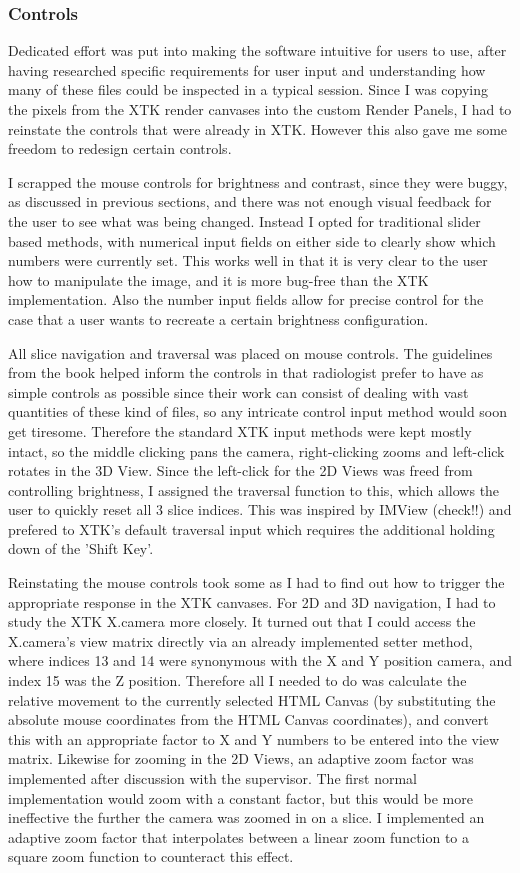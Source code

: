 \documentclass[a4paper,11pt,twoside]{article}
\begin{document}
\subsubsection{Controls}

Dedicated effort was put into making the software intuitive for users to use, after having researched specific requirements for user input and understanding how many of these files could be inspected in a typical session. Since I was copying the pixels from the XTK render canvases into the custom Render Panels, I had to reinstate the controls that were already in XTK. However this also gave me some freedom to redesign certain controls.

I scrapped the mouse controls for brightness and contrast, since they were buggy, as discussed in previous sections, and there was not enough visual feedback for the user to see what was being changed. Instead I opted for traditional slider based methods, with numerical input fields on either side to clearly show which numbers were currently set. This works well in that it is very clear to the user how to manipulate the image, and it is more bug-free than the XTK implementation. Also the number input fields allow for precise control for the case that a user wants to recreate a certain brightness configuration.

All slice navigation and traversal was placed on mouse controls. The guidelines from the book helped inform the controls in that radiologist prefer to have as simple controls as possible since their work can consist of dealing with vast quantities of these kind of files, so any intricate control input method would soon get tiresome. Therefore the standard XTK input methods were kept mostly intact, so the middle clicking pans the camera, right-clicking zooms and left-click rotates in the 3D View. Since the left-click for the 2D Views was freed from controlling brightness, I assigned the traversal function to this, which allows the user to quickly reset all 3 slice indices. This was inspired by IMView (check!!) and prefered to XTK's default traversal input which requires the additional holding down of the 'Shift Key'.

Reinstating the mouse controls took some as I had to find out how to trigger the appropriate response in the XTK canvases. For 2D and 3D navigation, I had to study the XTK X.camera more closely. It turned out that I could access the X.camera's view matrix directly via an already implemented setter method, where indices 13 and 14 were synonymous with the X and Y position camera, and index 15 was the Z position. Therefore all I needed to do was calculate the relative movement to the currently selected HTML Canvas (by substituting the absolute mouse coordinates from the HTML Canvas coordinates), and convert this with an appropriate factor to X and Y numbers to be entered into the view matrix.
Likewise for zooming in the 2D Views, an adaptive zoom factor was implemented after discussion with the supervisor. The first normal implementation would zoom with a constant factor, but this would be more ineffective the further the camera was zoomed in on a slice. I implemented an adaptive zoom factor that interpolates between a linear zoom function to a square zoom function to counteract this effect.
\end{document}
